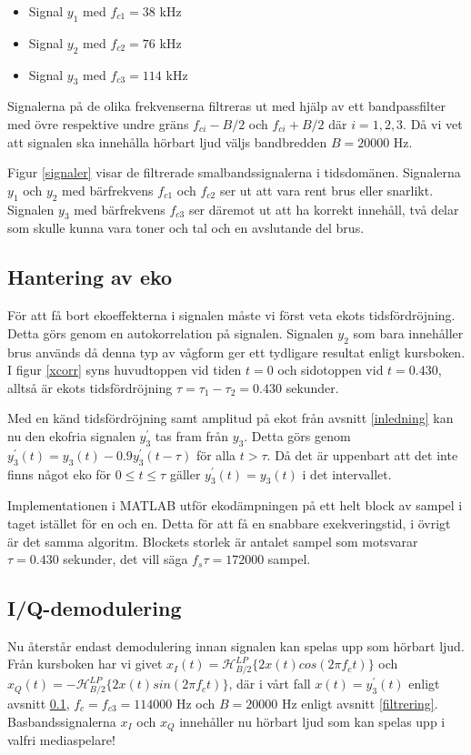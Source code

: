\documentclass[10pt]{article}
\begin{document}
\begin{multicols}{2}
\begin{itemize}
\item Signal $y_1$ med $f_{c1}=38$ kHz
\item Signal $y_2$ med $f_{c2}=76$ kHz
\item Signal $y_3$ med $f_{c3}=114$ kHz
\end{itemize}

Signalerna på de olika frekvenserna filtreras ut med hjälp av ett bandpassfilter med övre respektive undre gräns $f_{ci} - B/2$ och $f_{ci} + B/2$ där $i = 1,2,3$. Då vi vet att signalen ska innehålla hörbart ljud väljs bandbredden $B=20000$ Hz.


Figur \ref{signaler} visar de filtrerade smalbandssignalerna i tidsdomänen. Signalerna $y_1$ och $y_2$ med bärfrekvens $f_{c1}$ och $f_{c2}$ ser ut att vara rent brus eller snarlikt. Signalen $y_3$ med bärfrekvens $f_{c3}$ ser däremot ut att ha korrekt innehåll, två delar som skulle kunna vara toner och tal och en avslutande del brus.

\subsection{Hantering av eko} \label{eko}
För att få bort ekoeffekterna i signalen måste vi först veta ekots tidsfördröjning. Detta görs genom en autokorrelation på signalen. Signalen $y_2$ som bara innehåller brus används då denna typ av vågform ger ett tydligare resultat enligt kursboken. I figur \ref{xcorr} syns huvudtoppen vid tiden $t = 0$ och sidotoppen vid $t = 0.430$, alltså är ekots tidsfördröjning $\tau = \tau_{1} - \tau_{2} = 0.430$ sekunder.

Med en känd tidsfördröjning samt amplitud på ekot från avsnitt \ref{inledning} kan nu den ekofria signalen $y_{3}^{'}$ tas fram från $y_3$. Detta görs genom $y_{3}^{'}(t) = y_{3}(t) - 0.9y_{3}^{'}(t - \tau)$ för alla $t > \tau$. Då det är uppenbart att det inte finns något eko för $0 \leq t \leq \tau$ gäller $y_{3}^{'}(t) = y_{3}(t)$ i det intervallet.

Implementationen i MATLAB utför ekodämpningen på ett helt block av sampel i taget istället för en och en. Detta för att få en snabbare exekveringstid, i övrigt är det samma algoritm. Blockets storlek är antalet sampel som motsvarar $\tau = 0.430$ sekunder, det vill säga $f_s\tau = 172000$ sampel.

\subsection{I/Q-demodulering}
Nu återstår endast demodulering innan signalen kan spelas upp som hörbart ljud. Från kursboken har vi givet $x_I(t) = \mathcal{H}_{B/2}^{LP}\{2x(t)cos(2\pi f_ct)\}$ och $x_Q(t) = -\mathcal{H}_{B/2}^{LP}\{2x(t)sin(2\pi f_ct)\}$, där i vårt fall $x(t) = y_{3}^{'}(t)$ enligt avsnitt \ref{eko}, $f_c = f_{c3} = 114000$ Hz och $B = 20000$ Hz enligt avsnitt \ref{filtrering}. Basbandssignalerna $x_I$ och $x_Q$ innehåller nu hörbart ljud som kan spelas upp i valfri mediaspelare!


\end{multicols}
\end{document}
